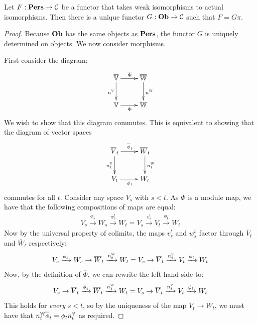 \begin{theorem}
\label{thm-universal-property}
Let $F : \mathbf{Pers} \to \mathcal{C}$ be a functor that takes weak isomorphisms to actual isomorphisms. Then there is a unique functor $G : \mathbf{Ob} \to \mathcal{C}$ such that $F = G \pi$.
\end{theorem}
\begin{proof}
Because $\mathbf{Ob}$ has the same objects as $\mathbf{Pers}$, the functor $G$ is uniquely determined on objects. We now consider morphisms.

First consider the diagram:
\begin{displaymath}
\xymatrix{
\overline \V \ar[r]^{\overline \Phi} \ar[d]_{n^\V} & \overline \W  \ar[d]^{n^\W}\\
\V \ar[r]_{\Phi} & \W
}
\end{displaymath}
We wish to show that this diagram commutes. This is equivalent to showing that the diagram of vector spaces
\begin{displaymath}
\xymatrix{
\overline V_t \ar[r]^{\overline \phi_t} \ar[d]_{n^\V_t} & \overline W_t  \ar[d]^{n^\W_t}\\
V_t \ar[r]_{\phi_t} & W_t
}
\end{displaymath}
commutes for all $t$. Consider any space $V_s$ with $s < t$. As $\Phi$ is a module map, we have that the following compositions of maps are equal:
\begin{align*}
V_s \xrightarrow{\phi_s} W_s \xrightarrow{w_s^t} W_t = V_s \xrightarrow{v_s^t} V_t \xrightarrow{\phi_t} W_t
\end{align*}
Now by the universal property of colimits, the maps $v_s^t$ and $w_s^t$ factor through $\overline V_t$ and $\overline W_t$ respectively:
\begin{align*}
V_s \xrightarrow{\phi_s} W_s \to \overline W_t \xrightarrow{n^{\mathbb{W}}_t} W_t = V_s \to \overline V_t \xrightarrow{n^{\mathbb{V}}_t} V_t \xrightarrow{\phi_t} W_t
\end{align*}
Now, by the definition of $\overline \Phi$, we can rewrite the left hand side to:
\begin{align*}
V_s \to \overline V_t \xrightarrow{\overline \phi_t} \overline W_t \xrightarrow{n^{\mathbb{W}}_t} W_t = V_s \to \overline V_t \xrightarrow{n^{\mathbb{V}}_t} V_t \xrightarrow{\phi_t} W_t
\end{align*}
This holds for \emph{every} $s < t$, so by the uniqueness of the map $\overline V_t \to W_t$, we must have that $n^{\mathbb{W}}_t \overline \phi_t = \phi_t n^{\mathbb{V}}_t$ as required.


\end{proof}
